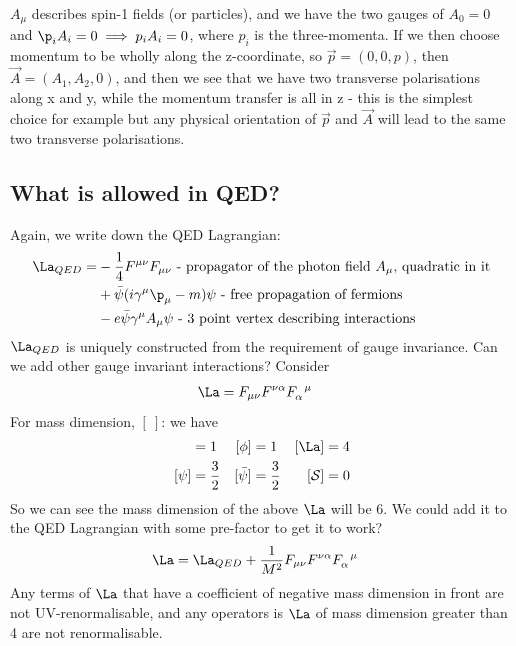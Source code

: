 \documentclass[relqm.tex]{subfiles}
\begin{document}
$A_\mu$ describes spin-1 fields (or particles), and we have the two gauges of $A_0 = 0$ and $\p_i A_i = 0 \implies p_i A_i = 0$, where $p_i$ is the three-momenta.
If we then choose momentum to be wholly along the z-coordinate, so $\vec{p}=(0,0,p)$, then $\vec{A} = (A_1,A_2,0)$, and then we see that we have two transverse polarisations along x and y, while the momentum transfer is all in z - this is the simplest choice for example but any physical orientation of $\vec{p}$ and $\vec{A}$ will lead to the same two transverse polarisations.

\subsection{What is allowed in QED?}
Again, we write down the QED Lagrangian:
\begin{align}
    \La_{QED} = &-\frac14 F^{\mu\nu}F_{\mu\nu} \text{ - propagator of the photon field $A_\mu$, quadratic in it} \nonumber \\
                &+ \bar{\psi}(i\gamma^\mu\p_\mu -m)\psi \text{ - free propagation of fermions} \nonumber \\
                &- e\bar{\psi}\gamma^\mu A_\mu\psi \text{ - 3 point vertex describing interactions}
\end{align}
$\La_{QED}$ is uniquely constructed from the requirement of gauge invariance. 
Can we add other gauge invariant interactions?
Consider
\begin{align}
    \La &= F_{\mu\nu}F^{\nu\alpha}\tensor{F}{_\alpha^\mu}
\end{align}
For mass dimension, $[\:]$: we have
\begin{align}
    [A_\mu] &= 1 & [\phi] & = 1 & [\La] &= 4 \\
    [\psi] &= \frac32 & [\bar{\psi}] &= \frac32 & [\mathcal{S}] &= 0 
\end{align}
So we can see the mass dimension of the above $\La$ will be 6. 
We could add it to the QED Lagrangian with some pre-factor to get it to work?
\begin{align}
    \La &= \La_{QED} + \frac{1}{M^2}F_{\mu\nu}F^{\nu\alpha}\tensor{F}{_\alpha^\mu}
\end{align}
Any terms of $\La$ that have a coefficient of negative mass dimension in front are not UV-renormalisable, and any operators is $\La$ of mass dimension greater than 4 are not renormalisable. 
\end{document}
